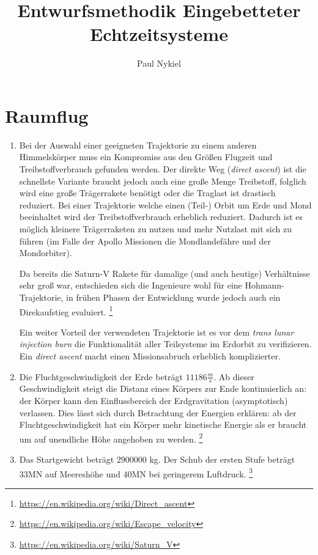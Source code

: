 \documentclass[DIN, pagenumber=false, fontsize=11pt, parskip=half]{scrartcl}
\title{Entwurfsmethodik Eingebetteter Echtzeitsysteme}
\author{Paul Nykiel}
\begin{document}
    \maketitle
    \section{Raumflug}
    \begin{enumerate}[label=\alph*)]
        \item Bei der Auswahl einer geeigneten Trajektorie zu einem anderen Himmelskörper
            muss ein Kompromiss aus den Größen Flugzeit und Treibstoffverbrauch gefunden
            werden. Der direkte Weg (\textit{direct ascent}) ist die schnellste Variante
            braucht jedoch auch eine große Menge Treibstoff, folglich wird eine große
            Trägerrakete benötigt oder die Traglast ist drastisch reduziert. Bei einer
            Trajektorie welche einen (Teil-) Orbit um Erde und Mond beeinhaltet wird der
            Treibstoffverbrauch erheblich reduziert. Dadurch ist es möglich kleinere
            Trägerraketen zu nutzen und mehr Nutzlast mit sich zu führen (im Falle der
            Apollo Missionen die Mondlandefähre und der Mondorbiter).

            Da bereits die Saturn-V Rakete für damalige (und auch heutige) Verhältnisse
            sehr groß war, entschieden sich die Ingenieure wohl für eine 
            Hohmann-Trajektorie, in frühen Phasen der Entwicklung wurde jedoch auch ein
            Direkaufstieg evaluiert. \footnote{\url{https://en.wikipedia.org/wiki/Direct_ascent}}

            Ein weiter Vorteil der verwendeten Trajektorie ist es vor dem 
            \textit{trans lunar injection burn} die Funktionalität aller Teilsysteme
            im Erdorbit zu verifizieren. Ein \textit{direct ascent} macht einen 
            Missionsabruch erheblich komplizierter.
        \item Die Fluchtgeschwindigkeit der Erde beträgt $11186\frac{m}{s}$.
            Ab dieser Geschwindigkeit steigt die Distanz eines Körpers zur Ende
            kontinuierlich an: der Körper kann den Einflussbereich der Erdgravitation
            (asymptotisch) verlassen. Dies lässt sich durch Betrachtung der Energien
            erklären: ab der Fluchtgeschwindigkeit hat ein Körper mehr kinetische Energie
            als er braucht um auf \glqq{}unendliche\grqq{} Höhe angehoben zu werden.
            \footnote{\url{https://en.wikipedia.org/wiki/Escape_velocity}}
        \item Das Startgewicht beträgt $2900000$ kg. Der Schub der ersten Stufe beträgt
            33MN auf Meereshöhe und 40MN bei geringerem Luftdruck.
            \footnote{\url{https://en.wikipedia.org/wiki/Saturn_V}}
    

\end{enumerate}
\end{document}
